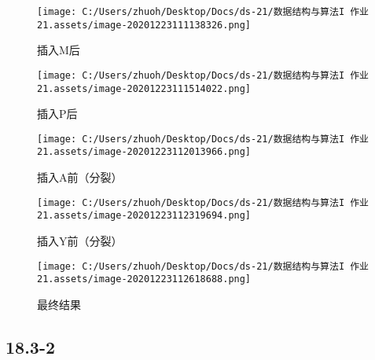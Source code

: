 \documentclass[]{article}
\begin{document}
\begin{figure}[H]
\centering
\texttt{[image: C:/Users/zhuoh/Desktop/Docs/ds-21/数据结构与算法I 作业21.assets/image-20201223111138326.png]}
\caption{插入M后}
\end{figure}

\begin{figure}[H]
\centering
\texttt{[image: C:/Users/zhuoh/Desktop/Docs/ds-21/数据结构与算法I 作业21.assets/image-20201223111514022.png]}
\caption{插入P后}
\end{figure}


\begin{figure}[H]
\centering
\texttt{[image: C:/Users/zhuoh/Desktop/Docs/ds-21/数据结构与算法I 作业21.assets/image-20201223112013966.png]}
\caption{插入A前（分裂）}
\end{figure}


\begin{figure}[H]
\centering
\texttt{[image: C:/Users/zhuoh/Desktop/Docs/ds-21/数据结构与算法I 作业21.assets/image-20201223112319694.png]}
\caption{插入Y前（分裂）}
\end{figure}


\begin{figure}[H]
\centering
\texttt{[image: C:/Users/zhuoh/Desktop/Docs/ds-21/数据结构与算法I 作业21.assets/image-20201223112618688.png]}
\caption{最终结果}
\end{figure}

\hypertarget{header-n105}{%
\subsection{18.3-2}\label{header-n105}}
\end{document}
